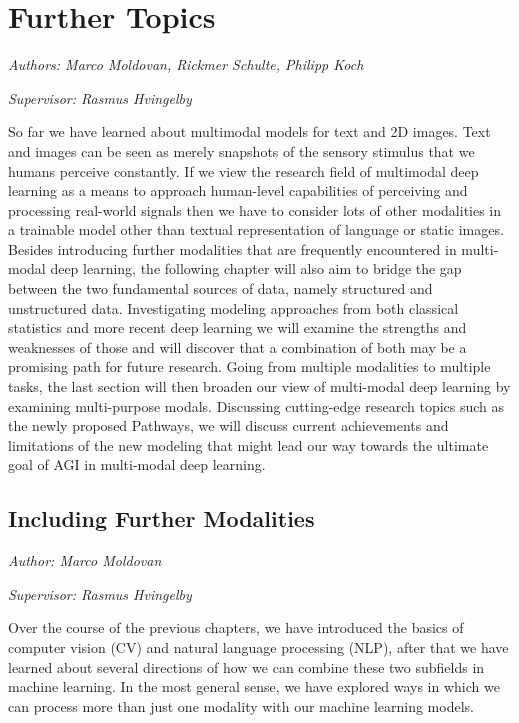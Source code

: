 \documentclass[
]{krantz}
\begin{document}
\hypertarget{c03-00-further}{%
\chapter{Further Topics}\label{c03-00-further}}

\emph{Authors: Marco Moldovan, Rickmer Schulte, Philipp Koch}

\emph{Supervisor: Rasmus Hvingelby}

So far we have learned about multimodal models for text and 2D images. Text and images can be seen as merely snapshots of the sensory stimulus that we humans perceive constantly. If we view the research field of multimodal deep learning as a means to approach human-level capabilities of perceiving and processing real-world signals then we have to consider lots of other modalities in a trainable model other than textual representation of language or static images. Besides introducing further modalities that are frequently encountered in multi-modal deep learning, the following chapter will also aim to bridge the gap between the two fundamental sources of data, namely structured and unstructured data. Investigating modeling approaches from both classical statistics and more recent deep learning we will examine the strengths and weaknesses of those and will discover that a combination of both may be a promising path for future research. Going from multiple modalities to multiple tasks, the last section will then broaden our view of multi-modal deep learning by examining multi-purpose modals. Discussing cutting-edge research topics such as the newly proposed Pathways, we will discuss current achievements and limitations of the new modeling that might lead our way towards the ultimate goal of AGI in multi-modal deep learning.

\hypertarget{c03-01-further-modalities}{%
\section{Including Further Modalities}\label{c03-01-further-modalities}}

\emph{Author: Marco Moldovan}

\emph{Supervisor: Rasmus Hvingelby}

Over the course of the previous chapters, we have introduced the basics of computer vision (CV) and natural language processing (NLP), after that we have learned about several directions of how we can combine these two subfields in machine learning. In the most general sense, we have explored ways in which we can process more than just one modality with our machine learning models.
\end{document}
